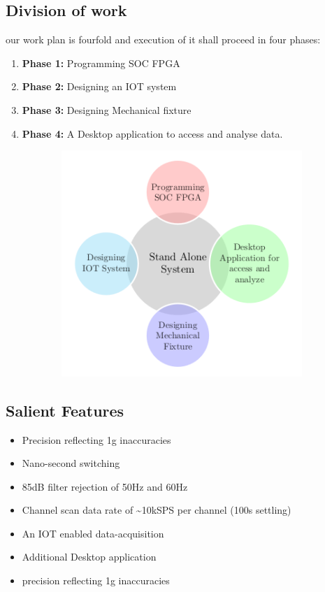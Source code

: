 \documentclass{FR16}
\begin{document}
\subsection{Division of work}
our work plan is fourfold and execution of it shall proceed in four phases:
\begin{enumerate}
     \item  \textbf{Phase 1:} Programming SOC FPGA 
    \item  \textbf{Phase 2:} Designing an IOT system
    \item \textbf{Phase 3:}  Designing Mechanical fixture
    \item \textbf{Phase 4:} A Desktop application to access and analyse data.
\end{enumerate}
  \begin{figure}[H]
    \begin{subfigure}{\textwidth}
    \includegraphics[scale=1]{smart-bubbles.png} 
    \label{fig:DJp1}
    \end{subfigure}
 

\label{fig6}
\end{figure}

\subsection{Salient Features}
\begin{itemize}
    \item Precision reflecting 1\textmu g inaccuracies
    \item Nano-second switching
    \item 85dB filter rejection of 50Hz and 60Hz
    \item Channel scan data rate of \sim 10kSPS per channel (100\textmu s settling)
    \item An IOT enabled data-acquisition
    \item Additional Desktop application 
    \item precision reflecting 1\textmu g inaccuracies
    

\end{itemize}
\end{document}
